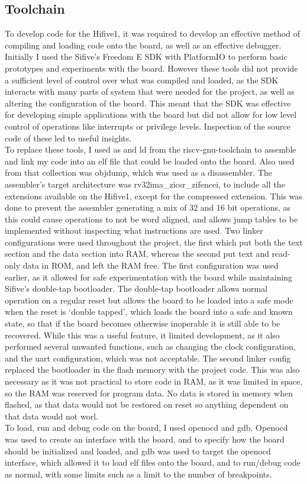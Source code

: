 \subsection{Toolchain}
To develop code for the Hifive1, it was required to develop an effective method of compiling and loading code onto the board, as well as an effective debugger. Initially I used the Sifive's Freedom E SDK with PlatformIO to perform basic prototypes and experiments with the board. However these tools did not provide a sufficient level of control over what was compiled and loaded, as the SDK interacts with many parts of system that were needed for the project, as well as altering the configuration of the board. This meant that the SDK was effective for developing simple applications with the board but did not allow for low level control of operations like interrupts or privilege levels. Inspection of the source code of these led to useful insights.\\
To replace these tools, I used as and ld from the riscv-gnu-toolchain to assemble and link my code into an elf file that could be loaded onto the board. Also used from that collection was objdump, which was used as a disassembler. The assembler's target architecture was rv32ima\_zicsr\_zifencei, to include all the extensions available on the Hifive1, except for the compressed extension. This was done to prevent the assembler generating a mix of 32 and 16 bit operations, as this could cause operations to not be word aligned, and allows jump tables to be implemented without inspecting what instructions are used. Two linker configurations were used throughout the project, the first which put both the text section and the data section into RAM, whereas the second put text and read-only data in ROM, and left the RAM free. The first configuration was used earlier, as it allowed for safe experimentation with the board while maintaining Sifive's double-tap bootloader. The double-tap bootloader allows normal operation on a regular reset but allows the board to be loaded into a safe mode when the reset is `double tapped', which loads the board into a safe and known state, so that if the board becomes otherwise inoperable it is still able to be recovered. While this was a useful feature, it limited development, as it also performed several unwanted functions, such as changing the clock configuration, and the uart configuration, which was not acceptable. The second linker config replaced the bootloader in the flash memory with the project code. This was also necessary as it was not practical to store code in RAM, as it was limited in space, so the RAM was reserved for program data. No data is stored in memory when flashed, as that data would not be restored on reset so anything dependent on that data would not worl.\\
To load, run and debug code on the board, I used openocd and gdb. Openocd was used to create an interface with the board, and to specify how the board should be initialized and loaded, and gdb was used to target the openocd interface, which allowed it to load elf files onto the board, and to run/debug code as normal, with some limits such as a limit to the number of breakpoints.

